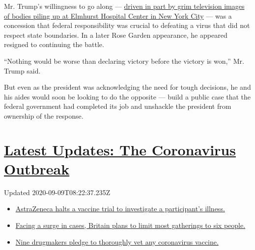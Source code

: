 Mr. Trump's willingness to go along ---
\href{https://www.nytimes3xbfgragh.onion/2020/03/30/us/politics/trump-coronavirus.html}{driven
in part by grim television images of bodies piling up at Elmhurst
Hospital Center in New York City} --- was a concession that federal
responsibility was crucial to defeating a virus that did not respect
state boundaries. In a later Rose Garden appearance, he appeared
resigned to continuing the battle.

``Nothing would be worse than declaring victory before the victory is
won,'' Mr. Trump said.

But even as the president was acknowledging the need for tough
decisions, he and his aides would soon be looking to do the opposite ---
build a public case that the federal government had completed its job
and unshackle the president from ownership of the response.

\hypertarget{latest-updates-the-coronavirus-outbreak}{%
\section{\texorpdfstring{\href{https://www.nytimes3xbfgragh.onion/2020/09/08/world/covid-19-coronavirus.html?action=click\&pgtype=Article\&state=default\&region=MAIN_CONTENT_1\&context=storylines_live_updates}{Latest
Updates: The Coronavirus
Outbreak}}{Latest Updates: The Coronavirus Outbreak}}\label{latest-updates-the-coronavirus-outbreak}}

Updated 2020-09-09T08:22:37.235Z

\begin{itemize}
\tightlist
\item
  \href{https://www.nytimes3xbfgragh.onion/2020/09/08/world/covid-19-coronavirus.html?action=click\&pgtype=Article\&state=default\&region=MAIN_CONTENT_1\&context=storylines_live_updates\#link-313b443d}{AstraZeneca
  halts a vaccine trial to investigate a participant's illness.}
\item
  \href{https://www.nytimes3xbfgragh.onion/2020/09/08/world/covid-19-coronavirus.html?action=click\&pgtype=Article\&state=default\&region=MAIN_CONTENT_1\&context=storylines_live_updates\#link-4438dd7}{Facing
  a surge in cases, Britain plans to limit most gatherings to six
  people.}
\item
  \href{https://www.nytimes3xbfgragh.onion/2020/09/08/world/covid-19-coronavirus.html?action=click\&pgtype=Article\&state=default\&region=MAIN_CONTENT_1\&context=storylines_live_updates\#link-679303d7}{Nine
  drugmakers pledge to thoroughly vet any coronavirus vaccine.}
\end{itemize}

